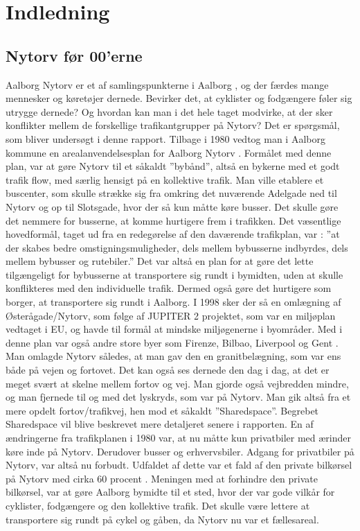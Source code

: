 \chapter{Indledning}
\label{chap:Indledning}

\section{Nytorv før 00'erne}
\label{sec:Nytorv før 00'erne}
Aalborg Nytorv er et af samlingspunkterne i Aalborg , og der færdes mange mennesker og køretøjer dernede. Bevirker det, at cyklister og fodgængere føler sig utrygge dernede? Og hvordan kan man i det hele taget modvirke, at der sker konflikter mellem de forskellige trafikantgrupper på Nytorv? Det er spørgsmål, som bliver undersøgt i denne rapport. 
Tilbage i 1980 vedtog man i Aalborg kommune en arealanvendelsesplan for Aalborg Nytorv . Formålet med denne plan, var at gøre Nytorv til et såkaldt ”bybånd”, altså en bykerne med et godt trafik flow, med særlig hensigt på en kollektive trafik. Man ville etablere et buscenter, som skulle strække sig fra omkring det nuværende Adelgade ned til Nytorv og op til Slotsgade, hvor der så kun måtte køre busser. Det skulle gøre det nemmere for busserne, at komme hurtigere frem i trafikken. Det  væsentlige hovedformål, taget ud fra en redegørelse af den daværende trafikplan, var :
”at der skabes bedre omstigningsmuligheder, dels mellem bybusserne     indbyrdes, dels mellem bybusser og rutebiler.”    
Det var altså en plan for at gøre det lette tilgængeligt for bybusserne at transportere sig rundt i bymidten, uden at skulle konflikteres med den individuelle trafik. Dermed også gøre det hurtigere som borger, at transportere sig rundt i Aalborg. 
I 1998 sker der så en omlægning af Østerågade/Nytorv, som følge af JUPITER 2 projektet, som var en miljøplan vedtaget i EU, og havde til formål at mindske miljøgenerne i byområder. Med i denne plan var også andre store byer som Firenze, Bilbao, Liverpool og Gent . Man omlagde Nytorv således, at man gav den en granitbelægning, som var ens både på vejen og fortovet. Det kan også ses dernede den dag i dag, at det er meget svært at skelne mellem fortov og vej. Man gjorde også vejbredden mindre, og man fjernede til og med det lyskryds, som var på Nytorv. Man gik altså fra et mere opdelt fortov/trafikvej, hen mod et såkaldt ”Sharedspace”. Begrebet Sharedspace vil blive beskrevet mere detaljeret senere i rapporten. En af ændringerne fra trafikplanen i 1980 var, at nu måtte kun privatbiler med ærinder køre inde på Nytorv. Derudover busser og erhvervsbiler. Adgang for privatbiler på Nytorv, var altså nu forbudt. Udfaldet af dette var et fald af den private bilkørsel på Nytorv med cirka 60 procent . Meningen med at forhindre den private bilkørsel, var at gøre Aalborg bymidte til et sted, hvor der var gode vilkår for cyklister, fodgængere og den kollektive trafik. Det skulle være lettere at transportere sig rundt på cykel og gåben, da Nytorv nu var et fællesareal.

